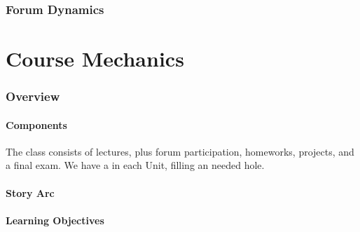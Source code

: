 \documentclass[12pt]{article}
\begin{document}
  \section*{\sc Forum Dynamics}
    \subsection*{}
    \subsection*{}
    \subsection*{}


    \newpage

\part{Course Mechanics}
  \section*{\sc Overview}

    \subsection*{Components}
      The class consists of lectures, plus forum participation, homeworks,
      projects, and a final exam.  We have a  in each
      Unit, filling an needed hole.

    \subsection*{Story Arc}

    \subsection*{Learning Objectives}
\end{document}
